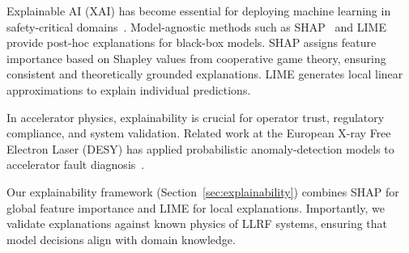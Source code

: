 Explainable AI (XAI) has become essential for deploying machine learning in safety-critical domains~\cite{xai_survey}. Model-agnostic methods such as SHAP~\cite{shap} and LIME~\cite{lime} provide post-hoc explanations for black-box models. SHAP assigns feature importance based on Shapley values from cooperative game theory, ensuring consistent and theoretically grounded explanations. LIME generates local linear approximations to explain individual predictions.

In accelerator physics, explainability is crucial for operator trust, regulatory compliance, and system validation. Related work at the European X-ray Free Electron Laser (DESY) has applied probabilistic anomaly-detection models to accelerator fault diagnosis~\cite{nawaz2021probabilistic}.

Our explainability framework (Section~\ref{sec:explainability}) combines SHAP for global feature importance and LIME for local explanations. Importantly, we validate explanations against known physics of LLRF systems, ensuring that model decisions align with domain knowledge.



